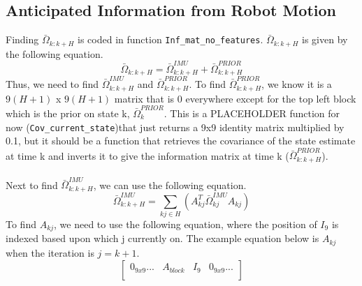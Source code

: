 \subsection{Anticipated Information from Robot Motion}\label{sub:info_motion}

Finding $\bar{\Omega}_{k:k+H}$ is coded in function \texttt{Inf\_mat\_no\_features}. $\bar{\Omega}_{k:k+H}$ is given by the following equation.
\begin{equation}
    \bar{\Omega}_{k:k+H} = \bar{\Omega}_{k:k+H}^{IMU} + \bar{\Omega}_{k:k+H}^{PRIOR}
    \label{eq:omega_IMU}
\end{equation}
Thus, we need to find $\bar{\Omega}_{k:k+H}^{IMU}$ and $\bar{\Omega}_{k:k+H}^{PRIOR}$. To find $\bar{\Omega}_{k:k+H}^{PRIOR}$, we know it is a $9(H+1)$ x $9(H+1)$ matrix that is 0 everywhere except for the top left block which is the prior on state k, $\bar{\Omega}_{k}^{PRIOR}$. This is a PLACEHOLDER function for now (\texttt{Cov\_current\_state})that just returns a 9x9 identity matrix multiplied by 0.1, but it should be a function that retrieves the covariance of the state estimate at time k and inverts it to give the information matrix at time k ($\bar{\Omega}_{k:k+H}^{PRIOR}$). \\ \\
Next to find $\bar{\Omega}_{k:k+H}^{IMU}$, we can use the following equation.
\begin{equation}
    \bar{\Omega}_{k:k+H}^{IMU} = \sum_{kj \in H} (A^T_{kj}\bar{\Omega}_{kj}^{IMU}A_{kj})
\end{equation}
To find $A_{kj}$, we need to use the following equation, where the position of $I_9$ is indexed based upon which j currently on. The example equation below is $A_{kj}$ when the iteration is $j = k + 1$.
\[
\begin{bmatrix}
    0_{9x9} ... & A_{block} & I_9 & 0_{9x9} ... \\
\end{bmatrix}\]

